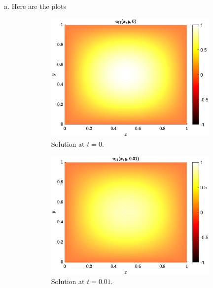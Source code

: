 \documentclass[12pt]{article} %
\begin{document}
\begin{solution}
\begin{enumerate}[(a)]
    \item Here are the plots
    \begin{figure}[H]
    	\centering
        \begin{subfigure}[b]{0.3\textwidth}
        \centering
    	\includegraphics[width=\textwidth]{figures/heat_solution_t=0}
        \caption{Solution at $t=0$.}
        \end{subfigure}
\hfill
        \begin{subfigure}[b]{0.3\textwidth}
        	\centering
        	\includegraphics[width=\textwidth]{figures/heat_solution_t=0.01}
            \caption{Solution at $t=0.01$.}
        \end{subfigure}
\hfill
        \begin{subfigure}[b]{0.3\textwidth}

\end{subfigure}
\end{figure}
\end{enumerate}
\end{solution}
\end{document}
